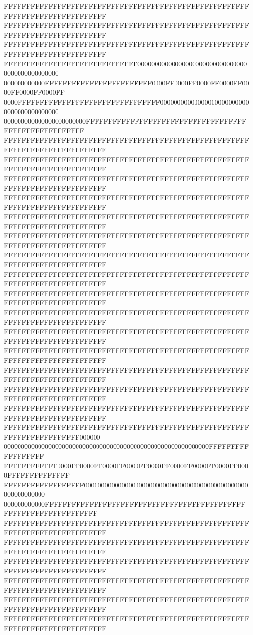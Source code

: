 FFFFFFFFFFFFFFFFFFFFFFFFFFFFFFFFFFFFFFFFFFFFFFFFFFFFFFFFFFFFFFFFFFFFFFFFFFFFFF
FFFFFFFFFFFFFFFFFFFFFFFFFFFFFFFFFFFFFFFFFFFFFFFFFFFFFFFFFFFFFFFFFFFFFFFFFFFFFF
FFFFFFFFFFFFFFFFFFFFFFFFFFFFFFFFFFFFFFFFFFFFFFFFFFFFFFFFFFFFFFFFFFFFFFFFFFFFFF
FFFFFFFFFFFFFFFFFFFFFFFFFFFFFF000000000000000000000000000000000000000000000000
000000000000FFFFFFFFFFFFFFFFFFFFFFFF0000FF0000FF0000FF0000FF0000FF0000FF0000FF
0000FFFFFFFFFFFFFFFFFFFFFFFFFFFFFFFF000000000000000000000000000000000000000000
000000000000000000000000FFFFFFFFFFFFFFFFFFFFFFFFFFFFFFFFFFFFFFFFFFFFFFFFFFFFFF
FFFFFFFFFFFFFFFFFFFFFFFFFFFFFFFFFFFFFFFFFFFFFFFFFFFFFFFFFFFFFFFFFFFFFFFFFFFFFF
FFFFFFFFFFFFFFFFFFFFFFFFFFFFFFFFFFFFFFFFFFFFFFFFFFFFFFFFFFFFFFFFFFFFFFFFFFFFFF
FFFFFFFFFFFFFFFFFFFFFFFFFFFFFFFFFFFFFFFFFFFFFFFFFFFFFFFFFFFFFFFFFFFFFFFFFFFFFF
FFFFFFFFFFFFFFFFFFFFFFFFFFFFFFFFFFFFFFFFFFFFFFFFFFFFFFFFFFFFFFFFFFFFFFFFFFFFFF
FFFFFFFFFFFFFFFFFFFFFFFFFFFFFFFFFFFFFFFFFFFFFFFFFFFFFFFFFFFFFFFFFFFFFFFFFFFFFF
FFFFFFFFFFFFFFFFFFFFFFFFFFFFFFFFFFFFFFFFFFFFFFFFFFFFFFFFFFFFFFFFFFFFFFFFFFFFFF
FFFFFFFFFFFFFFFFFFFFFFFFFFFFFFFFFFFFFFFFFFFFFFFFFFFFFFFFFFFFFFFFFFFFFFFFFFFFFF
FFFFFFFFFFFFFFFFFFFFFFFFFFFFFFFFFFFFFFFFFFFFFFFFFFFFFFFFFFFFFFFFFFFFFFFFFFFFFF
FFFFFFFFFFFFFFFFFFFFFFFFFFFFFFFFFFFFFFFFFFFFFFFFFFFFFFFFFFFFFFFFFFFFFFFFFFFFFF
FFFFFFFFFFFFFFFFFFFFFFFFFFFFFFFFFFFFFFFFFFFFFFFFFFFFFFFFFFFFFFFFFFFFFFFFFFFFFF
FFFFFFFFFFFFFFFFFFFFFFFFFFFFFFFFFFFFFFFFFFFFFFFFFFFFFFFFFFFFFFFFFFFFFFFFFFFFFF
FFFFFFFFFFFFFFFFFFFFFFFFFFFFFFFFFFFFFFFFFFFFFFFFFFFFFFFFFFFFFFFFFFFFFFFFFFFFFF
FFFFFFFFFFFFFFFFFFFFFFFFFFFFFFFFFFFFFFFFFFFFFFFFFFFFFFFFFFFFFFFFFFFFFFFFFFFFFF
FFFFFFFFFFFFFFFFFFFFFFFFFFFFFFFFFFFFFFFFFFFFFFFFFFFFFFFFFFFFFFFFFFFFFFFFFFFFFF
FFFFFFFFFFFFFFFFFFFFFFFFFFFFFFFFFFFFFFFFFFFFFFFFFFFFFFFFFFFFFFFFFFFFFFFFFFFFFF
FFFFFFFFFFFFFFFFFFFFFFFFFFFFFFFFFFFFFFFFFFFFFFFFFFFFFFFFFFFFFFFFFFFFFFFF000000
000000000000000000000000000000000000000000000000000000000000FFFFFFFFFFFFFFFFFF
FFFFFFFFFFFF0000FF0000FF0000FF0000FF0000FF0000FF0000FF0000FF0000FFFFFFFFFFFFFF
FFFFFFFFFFFFFFFFFF000000000000000000000000000000000000000000000000000000000000
000000000000FFFFFFFFFFFFFFFFFFFFFFFFFFFFFFFFFFFFFFFFFFFFFFFFFFFFFFFFFFFFFFFFFF
FFFFFFFFFFFFFFFFFFFFFFFFFFFFFFFFFFFFFFFFFFFFFFFFFFFFFFFFFFFFFFFFFFFFFFFFFFFFFF
FFFFFFFFFFFFFFFFFFFFFFFFFFFFFFFFFFFFFFFFFFFFFFFFFFFFFFFFFFFFFFFFFFFFFFFFFFFFFF
FFFFFFFFFFFFFFFFFFFFFFFFFFFFFFFFFFFFFFFFFFFFFFFFFFFFFFFFFFFFFFFFFFFFFFFFFFFFFF
FFFFFFFFFFFFFFFFFFFFFFFFFFFFFFFFFFFFFFFFFFFFFFFFFFFFFFFFFFFFFFFFFFFFFFFFFFFFFF
FFFFFFFFFFFFFFFFFFFFFFFFFFFFFFFFFFFFFFFFFFFFFFFFFFFFFFFFFFFFFFFFFFFFFFFFFFFFFF
FFFFFFFFFFFFFFFFFFFFFFFFFFFFFFFFFFFFFFFFFFFFFFFFFFFFFFFFFFFFFFFFFFFFFFFFFFFFFF

